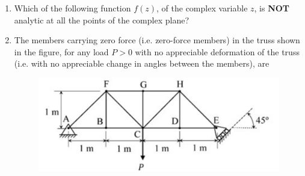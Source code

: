 \documentclass[12pt,onecolumn]{article}
\begin{document}
\begin{enumerate}
    \item Which of the following function $f(z)$, of the complex variable $z$, is \textbf{NOT} analytic at all the points of the complex plane?
          \begin{enumerate}
          \end{enumerate}

    \item The members carrying zero force (i.e. zero-force members) in the truss shown in the figure, for any load $P>0$ with no appreciable deformation of the truss (i.e. with no appreciable change in angles between the members), are
          \begin{figure}[H]
              \centering
              \includegraphics[scale=0.4]{q5}
              \label{fig:q5}
          \end{figure}
          \begin{enumerate}
          \end{enumerate}


\end{enumerate}
\end{document}
